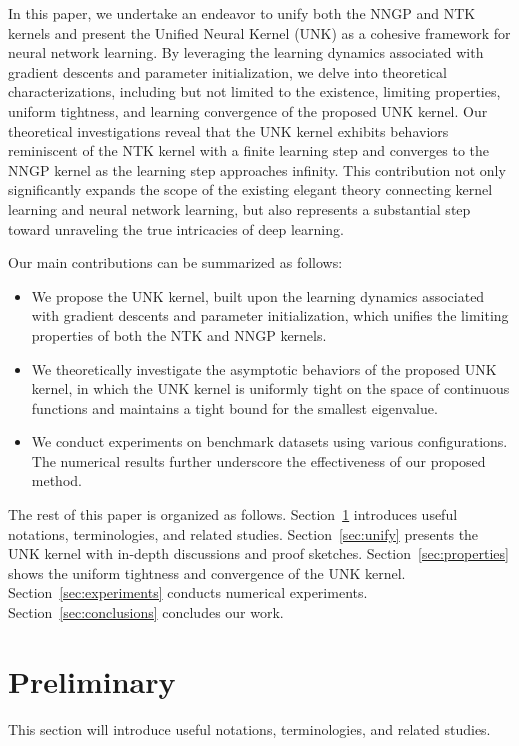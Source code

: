 \documentclass[review,10pt]{JMtemplate}
\begin{document}
In this paper, we undertake an endeavor to unify both the NNGP and NTK kernels and present the Unified Neural Kernel (UNK) as a cohesive framework for neural network learning. By leveraging the learning dynamics associated with gradient descents and parameter initialization, we delve into theoretical characterizations, including but not limited to the existence, limiting properties, uniform tightness, and learning convergence of the proposed UNK kernel. Our theoretical investigations reveal that the UNK kernel exhibits behaviors reminiscent of the NTK kernel with a finite learning step and converges to the NNGP kernel as the learning step approaches infinity. This contribution not only significantly expands the scope of the existing elegant theory connecting kernel learning and neural network learning, but also represents a substantial step toward unraveling the true intricacies of deep learning.

Our main contributions can be summarized as follows:
\begin{itemize}
    \item We propose the UNK kernel, built upon the learning dynamics associated with gradient descents and parameter initialization, which unifies the limiting properties of both the NTK and NNGP kernels.
    \item We theoretically investigate the asymptotic behaviors of the proposed UNK kernel, in which the UNK kernel is uniformly tight on the space of continuous functions and maintains a tight bound for the smallest eigenvalue.
    \item We conduct experiments on benchmark datasets using various configurations. The numerical results further underscore the effectiveness of our proposed method.
\end{itemize}

The rest of this paper is organized as follows. Section~\ref{sec:pre} introduces useful notations, terminologies, and related studies. Section~\ref{sec:unify} presents the UNK kernel with in-depth discussions and proof sketches. Section~\ref{sec:properties} shows the uniform tightness and convergence of the UNK kernel. Section~\ref{sec:experiments} conducts numerical experiments. Section~\ref{sec:conclusions} concludes our work.


\section{Preliminary}  \label{sec:pre}
This section will introduce useful notations, terminologies, and related studies.
\end{document}
